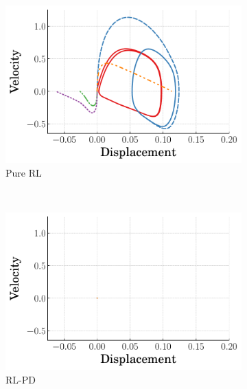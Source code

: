 \begin{figure}[h!]
  \centering
  \begin{subfigure}[b]{0.49\textwidth}
      \centering
      \includegraphics[width=\textwidth]{figures/figures_stability/time_responses_duffing/duffing_pure_RL/duffing_pure_RL_phase_plots.pdf}
      \caption{Pure RL}
      \label{subfig_chap3:duffing_pure_RL_phase_plot}
  \end{subfigure}\\
  \hfill
  \begin{subfigure}[b]{0.49\textwidth}
    \centering
    \includegraphics[width=\textwidth]{figures/figures_stability/time_responses_duffing/duffing_RL_PD/duffing_RL_PD_phase_plots.pdf}
    \caption{RL-PD}
    \label{subfig_chap3:duffing_RL_PD_phase_plot}
  \end{subfigure}
  \hfill
  \begin{subfigure}[b]{0.49\textwidth}

\end{subfigure}
\end{figure}
